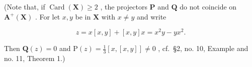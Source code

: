 (Note that, if \(\operatorname{Card}(\mathbf{X}) \geqslant 2\) , the projectors \(\mathbf{P}\) and \(\mathbf{Q}\) do not coincide on \(\mathbf{A}^{+}(\mathbf{X})\) . For let \(x, y\) be in \(\mathbf{X}\) with \(x \neq y\) and write

\[
z = x [ x, y ] + [ x, y ] x = x ^ {2} y - y x ^ {2}.
\]

Then \(\mathbf{Q}(z) = 0\) and \(\mathrm{P}(z) = \frac{1}{3}[x, [x,y]] \neq 0\) , cf.~§2, no. 10, Example and no. 11, Theorem 1.)

